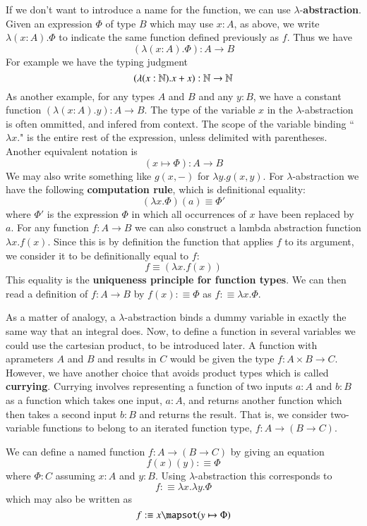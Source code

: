 If we don't want to introduce a name for the function, we can use $\lambda$-\textbf{abstraction}. Given an expression $\Phi$ of type $B$ which may use $x:A$, as above, we write $\lambda(x:A).\Phi$ to indicate the same function defined previously as $f$. Thus we have $$(\lambda(x:A).\Phi):A\rightarrow B$$
For example we have the typing judgment \begin{equation*}
    (\lambda(x:\mathbb N).x+x):\mathbb N\rightarrow \mathbb N
\end{equation*}
As another example, for any types $A$ and $B$ and any $y:B$, we have a constant function $(\lambda(x:A).y):A\rightarrow B$. The type of the variable $x$ in the $\lambda$-abstraction is often ommitted, and infered from context. The scope of the variable binding ``$\lambda x.$" is the entire rest of the expression, unless delimited with parentheses. Another equivalent notation is $$(x\mapsto \Phi):A\rightarrow B$$
We may also write something like $g(x,-)$ for $\lambda y.g(x,y)$. For $\lambda$-abstraction we have the following \textbf{computation rule}, which is definitional equality: $$(\lambda x.\Phi)(a) \equiv \Phi'$$ 
where $\Phi'$ is the expression $\Phi$ in which all occurrences of $x$ have been replaced by $a$. For any function $f:A\rightarrow B$ we can also construct a lambda abstraction function $\lambda x.f(x)$. Since this is by definition the function that applies $f$ to its argument, we consider it to be definitionally equal to $f$: $$f\equiv (\lambda x.f(x))$$
This equality is the \textbf{uniqueness principle for function types}. We can then read a definition of $f:A\rightarrow B$ by $f(x) :\equiv \Phi$ as $f :\equiv \lambda x.\Phi$. 

As a matter of analogy, a $\lambda$-abstraction binds a dummy variable in exactly the same way that an integral does. Now, to define a function in several variables we could use the cartesian product, to be introduced later. A function with aprameters $A$ and $B$ and results in $C$ would be given the type $f:A\times B\rightarrow C$. However, we have another choice that avoids product types which is called \textbf{currying}. Currying involves representing a function of two inputs $a:A$ and $b:B$ as a function which takes one input, $a:A$, and returns another function which then takes a second input $b:B$ and returns the result. That is, we consider two-variable functions to belong to an iterated function type, $f:A\rightarrow (B\rightarrow C)$.

We can define a named function $f:A\rightarrow (B\rightarrow C)$ by giving an equation $$f(x)(y):\equiv \Phi$$ 
where $\Phi:C$ assuming $x:A$ and $y:B$. Using $\lambda$-abstraction this corresponds to $$f:\equiv \lambda x.\lambda y.\Phi$$
which may also be written as \begin{equation*}
    f : \equiv x\mapsot (y\mapsto \Phi)
\end{equation*}


